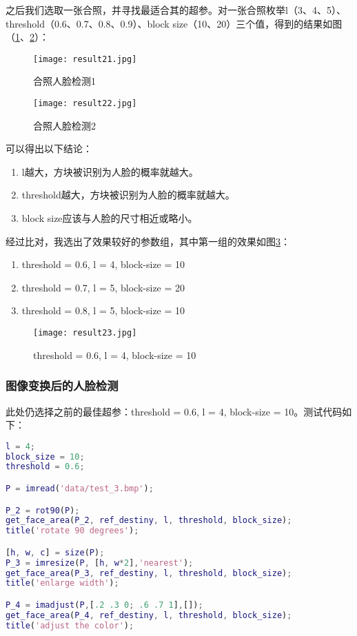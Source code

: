 \documentclass[a4paper]{article}
\begin{document}
\par 之后我们选取一张合照，并寻找最适合其的超参。对一张合照枚举l（3、4、5）、threshold（0.6、0.7、0.8、0.9）、block size（10、20）三个值，得到的结果如图（\ref{fig:result 21}、\ref{fig:result 22}）：

\begin{figure}[ht]
    \centering
    \texttt{[image: result21.jpg]}
    \caption{合照人脸检测1}
    \label{fig:result 21}
\end{figure}

\begin{figure}[ht]
    \centering
    \texttt{[image: result22.jpg]}
    \caption{合照人脸检测2}
    \label{fig:result 22}
\end{figure}

\par 可以得出以下结论：
\begin{enumerate}
    \item l越大，方块被识别为人脸的概率就越大。
    \item threshold越大，方块被识别为人脸的概率就越大。
    \item block size应该与人脸的尺寸相近或略小。
\end{enumerate}

\par 经过比对，我选出了效果较好的参数组，其中第一组的效果如图\ref{fig:result 23}：
\begin{enumerate}
    \item threshold = 0.6, l = 4, block-size = 10
    \item threshold = 0.7, l = 5, block-size = 20
    \item threshold = 0.8, l = 5, block-size = 10
\end{enumerate}

\begin{figure}[ht]
    \centering
    \texttt{[image: result23.jpg]}
    \caption{threshold = 0.6, l = 4, block-size = 10}
    \label{fig:result 23}
\end{figure}

\subsubsection{图像变换后的人脸检测}
\par 此处仍选择之前的最佳超参：threshold = 0.6, l = 4, block-size = 10。测试代码如下：
\begin{lstlisting}[language=matlab, caption=图像变换]
l = 4;
block_size = 10;
threshold = 0.6;

P = imread('data/test_3.bmp');

P_2 = rot90(P);
get_face_area(P_2, ref_destiny, l, threshold, block_size);
title('rotate 90 degrees');

[h, w, c] = size(P);
P_3 = imresize(P, [h, w*2],'nearest');
get_face_area(P_3, ref_destiny, l, threshold, block_size);
title('enlarge width');

P_4 = imadjust(P,[.2 .3 0; .6 .7 1],[]);
get_face_area(P_4, ref_destiny, l, threshold, block_size);
title('adjust the color');
\end{lstlisting}
\end{document}
